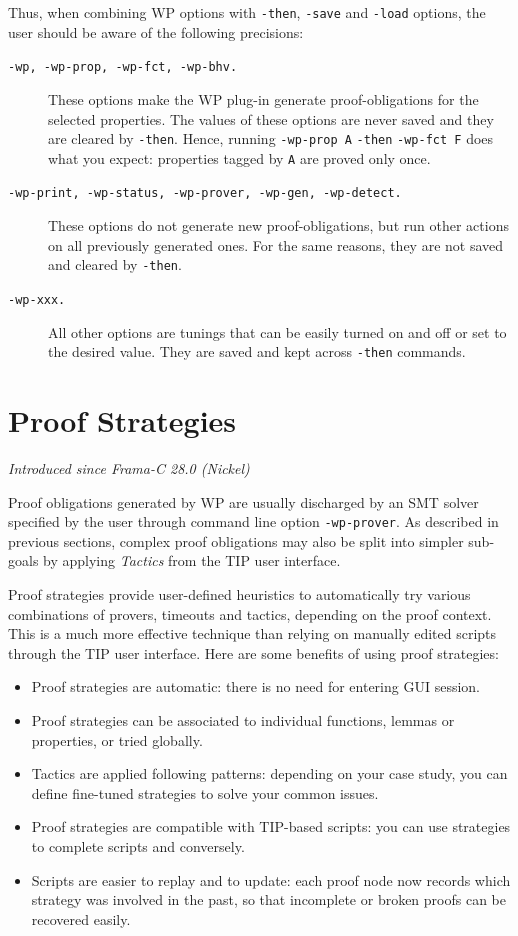 Thus, when combining \textsf{WP}
options with \texttt{-then}, \texttt{-save} and \texttt{-load}
options, the user should be aware of the following precisions:
\begin{description}
\item[\tt -wp, -wp-prop, -wp-fct, -wp-bhv.] These options make the
  \textsf{WP} plug-in generate proof-obligations for the selected
  properties. The values of these options are never saved and they are
  cleared by \texttt{-then}. Hence, running \texttt{-wp-prop A}
  \texttt{-then} \texttt{-wp-fct F} does what you expect:
  properties tagged by \texttt{A} are proved only once.
\item[\tt -wp-print, -wp-status, -wp-prover, -wp-gen, -wp-detect.]
  These options do not
  generate new proof-obligations, but run other actions on all
  previously generated ones. For the same reasons, they are not saved
  and cleared by \texttt{-then}.
\item[\tt -wp-xxx.] All other options are tunings that can be easily
  turned on and off or set to the desired value.
  They are saved and kept across \texttt{-then} commands.
\end{description}

\section{Proof Strategies}
\label{wp-proof-strategies}

\emph{Introduced since Frama-C 28.0 (Nickel)}

Proof obligations generated by \textsf{WP} are usually discharged by an
\textsf{SMT} solver specified by the user through command line option
\verb$-wp-prover$. As described in previous sections, complex proof obligations
may also be split into simpler sub-goals by applying \emph{Tactics} from the
\textsf{TIP} user interface.

Proof strategies provide user-defined heuristics to automatically try various
combinations of provers, timeouts and tactics, depending on the proof
context. This is a much more effective technique than relying on manually edited
scripts through the \textsf{TIP} user interface. Here are some benefits of using
proof strategies:
\begin{itemize}
\item Proof strategies are automatic: there is no need for entering GUI session.
\item Proof strategies can be associated to individual functions, lemmas or properties,
  or tried globally.
\item Tactics are applied following patterns: depending on your case study, you can
  define fine-tuned strategies to solve your common issues.
\item Proof strategies are compatible with TIP-based scripts: you can use
  strategies to complete scripts and conversely.
\item Scripts are easier to replay and to update: each proof node now records
  which strategy was involved in the past, so that incomplete or broken proofs
  can be recovered easily.
\end{itemize}

